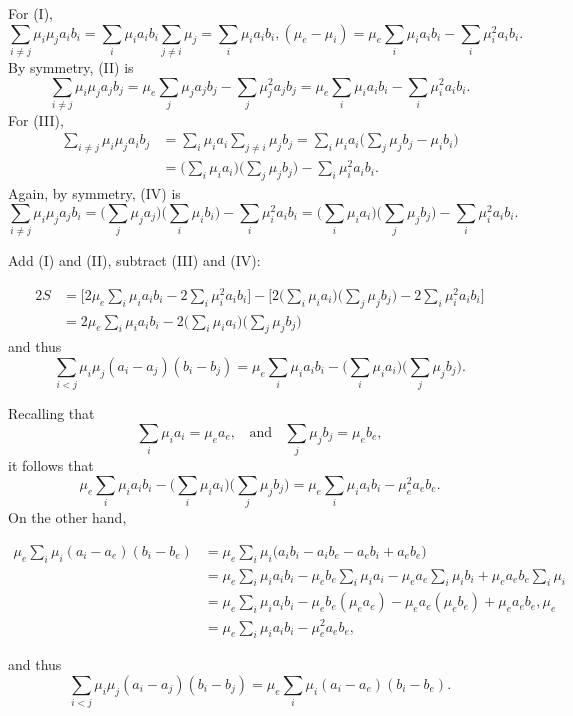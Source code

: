 \documentclass[12pt]{amsart}
\theoremstyle{plain}
\theoremstyle{definition}
\begin{document}
For (I),
$$
\sum_{i\neq j}\mu_i\mu_j a_i b_i
=\sum_i\mu_i a_i b_i\sum_{j\neq i}\mu_j
=\sum_i\mu_i a_i b_i,(\mu_e-\mu_i)
=\mu_e\sum_i\mu_i a_i b_i-\sum_i \mu_i^2 a_i b_i.
$$
By symmetry, (II) is
$$
\sum_{i\neq j}\mu_i\mu_j a_j b_j
=\mu_e\sum_j\mu_j a_j b_j-\sum_j \mu_j^2 a_j b_j
=\mu_e\sum_i\mu_i a_i b_i-\sum_i \mu_i^2 a_i b_i.
$$
For (III),
\begin{equation*}
\begin{split}
\sum_{i\neq j}\mu_i\mu_j a_i b_j
&=\sum_i \mu_i a_i \sum_{j\neq i}\mu_j b_j
=\sum_i \mu_i a_i\Big(\sum_j \mu_j b_j-\mu_i b_i\Big) \\
&=\Big(\sum_i \mu_i a_i\Big)\Big(\sum_j \mu_j b_j\Big)-\sum_i \mu_i^2 a_i b_i.
\end{split}
\end{equation*}
Again, by symmetry, (IV) is
$$
\sum_{i\neq j}\mu_i\mu_j a_j b_i
=\Big(  \sum_j \mu_j a_j\Big)\Big(\sum_i \mu_i b_i\Big)-\sum_i \mu_i^2 a_i b_i
=\Big(\sum_i \mu_i a_i\Big)\Big(\sum_j \mu_j b_j\Big)-\sum_i \mu_i^2 a_i b_i.
$$

Add (I) and (II), subtract (III) and (IV):

\begin{equation*}
\begin{split}
2S
&=\Big[2\mu_e\sum_i\mu_i a_i b_i-2\sum_i \mu_i^2 a_i b_i\Big]
-\Big[2\Big(\sum_i \mu_i a_i\Big)\Big(\sum_j \mu_j b_j\Big)-2\sum_i \mu_i^2 a_i b_i\Big]\\
&=2\mu_e\sum_i\mu_i a_i b_i
-2\Big(\sum_i \mu_i a_i\Big)\Big(\sum_j \mu_j b_j\Big)
\end{split}
\end{equation*}
and thus
\begin{equation}
    \label{eqn:midStep}
\sum_{i<j}\mu_i\mu_j(a_i-a_j)(b_i-b_j)
=\mu_e\sum_i \mu_i a_i b_i
-\Big(\sum_i \mu_i a_i\Big)\Big(\sum_j \mu_j b_j\Big).
\end{equation}

Recalling that
$$
\sum_i \mu_i a_i=\mu_e a_e,\;\;\mbox{ and }\;\; \sum_j \mu_j b_j=\mu_e b_e,
$$
it follows that
$$
\mu_e\sum_i \mu_i a_i b_i
-\Big(\sum_i \mu_i a_i\Big)\Big(\sum_j \mu_j b_j\Big)
=\mu_e\sum_i \mu_i a_i b_i-\mu_e^2 a_e b_e.
$$
On the other hand,

$$
\begin{aligned}
\mu_e\sum_i \mu_i (a_i-a_e)(b_i-b_e)
&=\mu_e\sum_i \mu_i\big(a_i b_i-a_i b_e-a_e b_i+a_e b_e\big)\\
&=\mu_e\sum_i \mu_i a_i b_i
-\mu_e b_e\sum_i \mu_i a_i
-\mu_e a_e\sum_i \mu_i b_i
+\mu_e a_e b_e\sum_i \mu_i\\
&=\mu_e\sum_i \mu_i a_i b_i
-\mu_e b_e(\mu_e a_e)
-\mu_e a_e(\mu_e b_e)
+\mu_e a_e b_e,\mu_e\\
&=\mu_e\sum_i \mu_i a_i b_i-\mu_e^2 a_e b_e,
\end{aligned}
$$

and thus
$$
\sum_{i<j}\mu_i\mu_j(a_i-a_j)(b_i-b_j)
=\mu_e\sum_i \mu_i (a_i-a_e)(b_i-b_e).
$$


      
\end{document}
